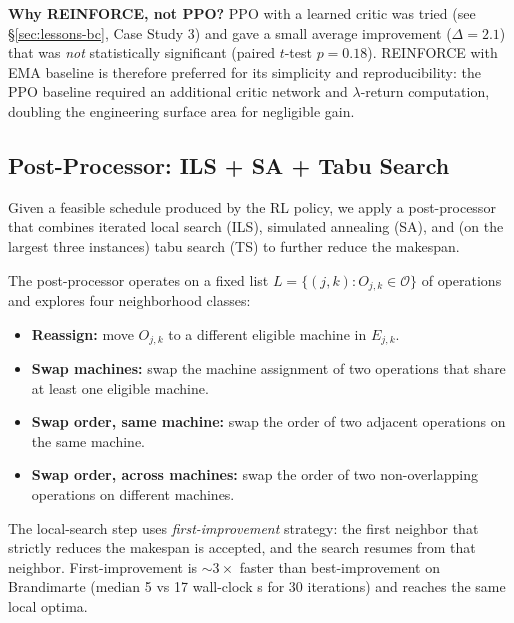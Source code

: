 \documentclass[10pt]{article}
\theoremstyle{definition}
\begin{document}
\textbf{Why REINFORCE, not PPO?}
PPO with a learned critic was tried (see
\S\ref{sec:lessons-bc}, Case Study 3) and gave a small
average improvement ($\Delta = 2.1$) that was \emph{not}
statistically significant (paired $t$-test $p = 0.18$).
REINFORCE with EMA baseline is therefore preferred for
its simplicity and reproducibility: the PPO baseline
required an additional critic network and
$\lambda$-return computation, doubling the engineering
surface area for negligible gain.

\subsection{Post-Processor: ILS + SA + Tabu Search}

Given a feasible schedule produced by the RL policy, we apply a
post-processor that combines iterated local search (ILS),
simulated annealing (SA), and (on the largest three instances)
tabu search (TS) to further reduce the makespan.

The post-processor operates on a fixed
list $L = \{(j, k) : O_{j,k} \in \mathcal{O}\}$ of operations
and explores four neighborhood classes:
\begin{itemize}
  \item[$N_1$] \textbf{Reassign:} move $O_{j,k}$ to a different
              eligible machine in $E_{j,k}$.
  \item[$N_2$] \textbf{Swap machines:} swap the machine
              assignment of two operations that share at least
              one eligible machine.
  \item[$N_3$] \textbf{Swap order, same machine:} swap the order
              of two adjacent operations on the same machine.
  \item[$N_4$] \textbf{Swap order, across machines:} swap the
              order of two non-overlapping operations on
              different machines.
\end{itemize}

The local-search step uses \emph{first-improvement} strategy:
the first neighbor that strictly reduces the makespan is
accepted, and the search resumes from that neighbor.
First-improvement is $\sim\!3\times$ faster than best-improvement
on Brandimarte (median 5 vs 17 wall-clock s for 30 iterations)
and reaches the same local optima.
\end{document}
